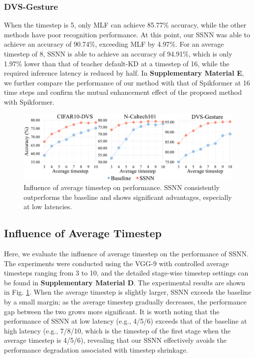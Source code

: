 \documentclass[letterpaper]{article} %
\begin{document}
\subsubsection{DVS-Gesture} When the timestep is 5, only MLF \cite{MLF} can achieve 85.77\% accuracy, while the other methods have poor recognition performance. At this point, our SSNN was able to achieve an accuracy of 90.74\%, exceeding MLF \cite{MLF} by 4.97\%. For an average timestep of 8, SSNN is able to achieve an accuracy of 94.91\%, which is only 1.97\% lower than that of teacher default-KD \cite{KD} at a timestep of 16, while the required inference latency is reduced by half. In \textbf{Supplementary Material E}, we further compare the performance of our method with that of Spikformer at 16 time steps and confirm the mutual enhancement effect of the proposed method with Spikformer.
\begin{figure}[!t]
\centering
\includegraphics[width=0.98\columnwidth]{timestep}
\caption{Influence of average timestep on performance. SSNN consistently outperforms the baseline and shows significant advantages, especially at low latencies.}
\label{timestep}
\end{figure}
\subsection{Influence of Average Timestep}
Here, we evaluate the influence of average timestep on the performance of SSNN. The experiments were conducted using the VGG-9 with controlled average timesteps ranging from 3 to 10, and the detailed stage-wise timestep settings can be found in \textbf{Supplementary Material D}. The experimental results are shown in Fig. \ref{timestep}. When the average timestep is slightly larger, SSNN exceeds the baseline by a small margin; as the average timestep gradually decreases, the performance gap between the two grows more significant. It is worth noting that the performance of SSNN at low latency (e.g., 4/5/6) exceeds that of the baseline at high latency (e.g., 7/8/10, which is the timestep of the first stage when the average timestep is 4/5/6), revealing that our SSNN effectively avoids the performance degradation associated with timestep shrinkage.
\end{document}
